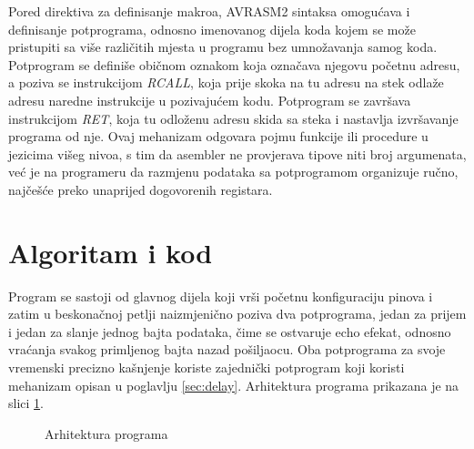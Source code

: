 Pored direktiva za definisanje makroa, \foreignlanguage{english}{AVRASM2} sintaksa
omogućava i definisanje potprograma, odnosno imenovanog dijela koda
kojem se može pristupiti sa više različitih mjesta u programu bez
umnožavanja samog koda. Potprogram se definiše običnom oznakom koja
označava njegovu početnu adresu, a poziva se instrukcijom \emph{RCALL}, koja
prije skoka na tu adresu na stek odlaže adresu naredne instrukcije u
pozivajućem kodu. Potprogram se završava instrukcijom \emph{RET}, koja tu
odloženu adresu skida sa steka i nastavlja izvršavanje programa od nje.
Ovaj mehanizam odgovara pojmu funkcije ili procedure u jezicima višeg
nivoa, s tim da asembler ne provjerava tipove niti broj argumenata, već
je na programeru da razmjenu podataka sa potprogramom organizuje ručno,
najčešće preko unaprijed dogovorenih registara.
%
\section{Algoritam i kod}
\label{sec:algorithm}
%
Program se sastoji od glavnog dijela koji vrši početnu konfiguraciju
pinova i zatim u beskonačnoj petlji naizmjenično poziva dva potprograma,
jedan za prijem i jedan za slanje jednog bajta podataka, čime se
ostvaruje \foreignlanguage{english}{echo} efekat, odnosno vraćanja svakog primljenog bajta
nazad pošiljaocu. Oba potprograma za svoje vremenski precizno kašnjenje
koriste zajednički potprogram koji koristi mehanizam opisan u poglavlju \ref{sec:delay}. Arhitektura
programa prikazana je na slici \ref{fig:architecture}.

\begin{figure}[H]
\centering
{}
\caption{Arhitektura programa}
\label{fig:architecture}
\end{figure}

